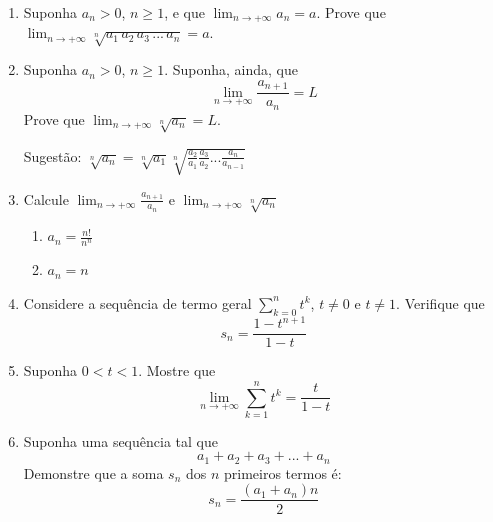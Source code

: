 \documentclass[11pt,a4paper]{article}
\newcommand{\limite}{\displaystyle\lim}
\newcommand{\somatorio}{\displaystyle\sum}
\begin{document}
\begin{enumerate}
		\item Suponha $a_n > 0$, $n \geq 1$, e que $\limite_{n \to +\infty} a_n = a$. Prove que $\limite_{n \to +\infty} \sqrt[n]{a_1 \, a_2 \, a_3 \, ... \, a_n} = a$. 
		
		\item Suponha $a_n > 0$, $n \geq 1$. Suponha, ainda, que
		$$ \limite_{n \to +\infty} \displaystyle \frac{a_{n + 1}}{a_n} = L$$
		Prove que $\limite_{n \to +\infty} \sqrt[n]{a_n} = L$. 
		
		Sugestão: $\sqrt[n]{a_n} = \sqrt[n]{a_1} \sqrt[n]{\frac{a_2}{a_1}\displaystyle\frac{a_3}{a_2} ... \displaystyle\frac{a_n}{a_{n-1}}}$
		
		\item Calcule $\limite_{n \to +\infty} \displaystyle \frac{a_{n + 1}}{a_n}$ e $\limite_{n \to +\infty} \sqrt[n]{a_n}$
		\begin{enumerate}
			\item $a_n = \displaystyle \frac{n!}{n^n}$
			\item $a_n = n$
			
		\end{enumerate}
		
		\item Considere a sequência de termo geral $\somatorio_{k=0}^{n} t^k $, $t \neq 0$ e $t \neq 1$. Verifique que
		$$s_n = \displaystyle\frac{1 - t^{n+1}}{1 - t}$$
		
		\item Suponha $0 < t < 1$. Mostre que
		$$\limite_{n \to +\infty} \somatorio_{k=1}^{n} t^k = \displaystyle\frac{t}{1 - t}$$
		
		\item Suponha uma sequência tal que
		$$a_1 + a_2 + a_3 + ... + a_n$$
		Demonstre que a soma $s_n$ dos $n$ primeiros termos é:
		$$s_n = \displaystyle\frac{(a_1 + a_n)n}{2}$$
		

\end{enumerate}
\end{document}
